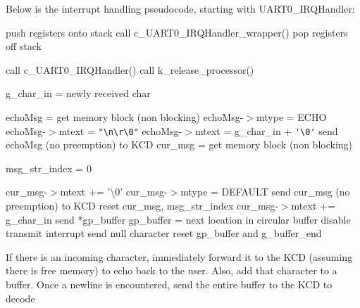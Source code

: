 \documentclass[12pt]{report}
\begin{document}
Below is the interrupt handling pseudocode, starting with UART0_IRQHandler:
\begin{algorithmic}[1]
    \State push registers onto stack
    \State call c_UART0_IRQHandler_wrapper()
    \State pop registers off stack
  \EndFunction
\end{algorithmic}
\begin{algorithmic}[1]
    \State call c_UART0_IRQHandler()
      \State call k_release_processor()
    \EndIf
  \EndFunction  
\end{algorithmic}
\begin{algorithmic}[1]
      \State g_char_in = newly received char
        \State\Return
      \EndIf

      \State echoMsg = get memory block (non blocking)
        \State echoMsg-$>$mtype = ECHO
          \State echoMsg-$>$mtext = \verb|"\n\r\0"|
        \Else
          \State echoMsg-$>$mtext = g_char_in + \verb|'\0'| 
        \EndIf
        \State send echoMsg (no preemption) to KCD
      \EndIf
        \State cur_msg = get memory block (non blocking)
          \State\Return
        \EndIf

        \State msg_str_index = 0
      \EndIf

        \State cur_msg-$>$mtext += '\textbackslash 0'
        \State cur_msg-$>$mtype = DEFAULT
        \State send cur_msg (no preemption) to KCD
        \State reset cur_msg, msg_str_index
      \Else
        \State cur_msg-$>$mtext += g_char_in
      \EndIf
        \State send *gp_buffer
        \State gp_buffer = next location in circular buffer
      \Else
        \State disable transmit interrupt
        \State send null character
        \State reset gp_buffer and g_buffer_end
      \EndIf
    \EndIf
  \EndFunction
\end{algorithmic}

If there is an incoming character, immediately forward it to the KCD (assuming there is free memory) to echo back to the user. Also, add that character to a buffer. Once a newline is encountered, send the entire buffer to the KCD to decode
\end{document}
